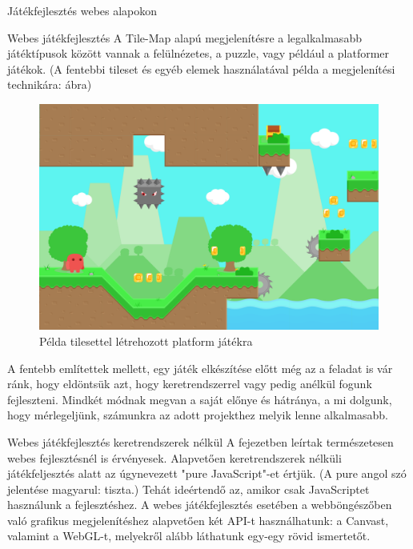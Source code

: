 \begin{MyChapter}{Játékfejlesztés webes alapokon}
\begin{MySection}{Webes játékfejlesztés}
		A Tile-Map alapú megjelenítésre a legalkalmasabb játéktípusok között vannak a felülnézetes, a puzzle, vagy például a platformer játékok. (A fentebbi tileset és egyéb elemek használatával példa a megjelenítési technikára:  ábra)
		\begin{figure}[h!]
			\centering
			\includegraphics[scale=0.35]{kepek/tileMap/TileMapPreview.png}
			\caption{Példa tilesettel létrehozott platform játékra}
			\label{fig:tileMap:tileMapPreview}
		\end{figure}
		
		A fentebb említettek mellett, egy játék elkészítése előtt még az a feladat is vár ránk, hogy eldöntsük azt, hogy keretrendszerrel vagy pedig anélkül fogunk fejleszteni. 
		Mindkét módnak megvan a saját előnye és hátránya, a mi dolgunk, hogy mérlegeljünk, számunkra az adott projekthez melyik lenne alkalmasabb.
	\end{MySection}

	\begin{MySection}{Webes játékfejlesztés keretrendszerek nélkül}
		A  fejezetben leírtak természetesen webes fejlesztésnél is érvényesek.
		Alapvetően keretrendszerek nélküli játékfeljesztés alatt az úgynevezett "pure JavaScript"-et értjük. (A pure angol szó jelentése magyarul: tiszta.)
		Tehát ideértendő az, amikor csak JavaScriptet használunk a fejlesztéshez. 
		A webes játékfejlesztés esetében a webböngészőben való grafikus megjelenítéshez alapvetően két API-t használhatunk: a Canvast, valamint a WebGL-t, melyekről alább láthatunk egy-egy rövid ismertetőt.
		

\end{MySection}
\end{MyChapter}
